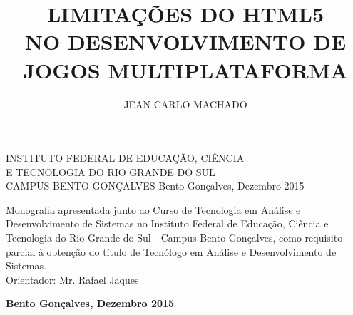 \documentclass[
12pt,
a4paper,
portuges,
draft
]{report}
\title{\uppercase{Limitações do HTML5 \\ no desenvolvimento de jogos multiplataforma}}
\author{\uppercase{Jean Carlo Machado}}
\newcommand{\university}{\uppercase{Instituto Federal de Educação, Ciência \\ e Tecnologia do Rio Grande do Sul \\ Campus Bento Gonçalves}}
\newcommand{\locale}{Bento Gonçalves, Dezembro 2015}
\begin{document}


\begin{titlepage}
    \begin{center}
        {\fontsize{14}{18}\selectfont \university}
        \vfill
        {\fontsize{16}{19}\selectfont \thetitle }
        \vfill
        {\fontsize{12}{15}\selectfont \theauthor}
        \vfill
        {\locale}
    \end{center}
\end{titlepage}


\begin{titlepage}
    \begin{center}
        {\fontsize{14}{18}\selectfont \theauthor}
        \vfill
        {\fontsize{16}{19}\selectfont \thetitle }
        \vfill
        \hfill
        \parbox[s]{8cm}{
        \singlespacing
            Monografia apresentada junto ao Curso
        de Tecnologia em Análise e Desenvolvimento de Sistemas no
    Instituto Federal de Educação, Ciência e Tecnologia do Rio
Grande do Sul - Campus Bento Gonçalves, como requisito parcial à
obtenção do título de Tecnólogo em Análise e Desenvolvimento de Sistemas.
        \\
        Orientador: Mr. Rafael Jaques
        }
        \vfill
        {\bfseries \locale}
    \end{center}
\end{titlepage}
\end{document}
